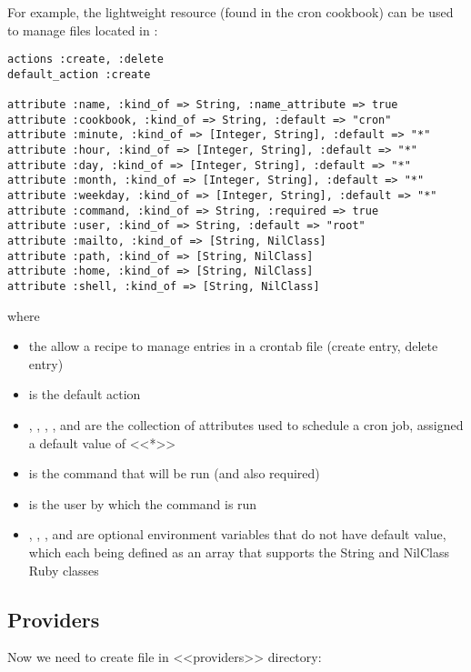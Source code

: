 For example, the  lightweight resource (found in the cron cookbook) can be used to manage files located in :

\begin{lstlisting}[label=lst:cookbook-lwrp3]
actions :create, :delete
default_action :create

attribute :name, :kind_of => String, :name_attribute => true
attribute :cookbook, :kind_of => String, :default => "cron"
attribute :minute, :kind_of => [Integer, String], :default => "*"
attribute :hour, :kind_of => [Integer, String], :default => "*"
attribute :day, :kind_of => [Integer, String], :default => "*"
attribute :month, :kind_of => [Integer, String], :default => "*"
attribute :weekday, :kind_of => [Integer, String], :default => "*"
attribute :command, :kind_of => String, :required => true
attribute :user, :kind_of => String, :default => "root"
attribute :mailto, :kind_of => [String, NilClass]
attribute :path, :kind_of => [String, NilClass]
attribute :home, :kind_of => [String, NilClass]
attribute :shell, :kind_of => [String, NilClass]
\end{lstlisting}

where

\begin{itemize}
  \item the  allow a recipe to manage entries in a crontab file (create entry, delete entry)
  \item {} is the default action
  \item {}, , , , and  are the collection of attributes used to schedule a cron job, assigned a default value of <<*>>
  \item {} is the command that will be run (and also required)
  \item {} is the user by which the command is run
  \item {}, , , and  are optional environment variables that do not have default value, which each being defined as an array that supports the String and NilClass Ruby classes
\end{itemize}

\subsection{Providers}

Now we need to create file  in <<providers>> directory:

